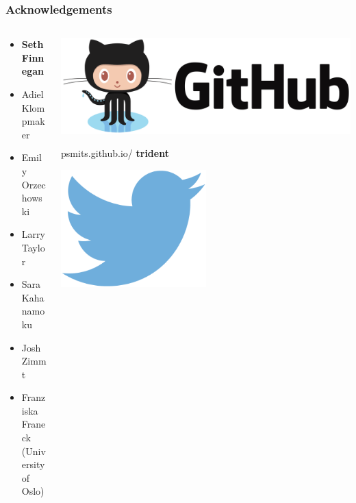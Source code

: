 \documentclass{beamer}
\begin{document}
\begin{frame}
  \frametitle{Acknowledgements}
  \begin{columns}
    \begin{column}{0.5\textwidth}
      \begin{itemize}
        \item \textbf{Seth Finnegan}
        \item Adiel Klompmaker 
        \item Emily Orzechowski
        \item Larry Taylor
        \item Sara Kahanamoku
        \item Josh Zimmt
        \item Franziska Franeck \\(University of Oslo)
      \end{itemize}
    \end{column}
    \begin{column}{0.5\textwidth}
      \begin{center}
        \includegraphics[height=0.15\textheight,width=\textwidth,keepaspectratio=true]{figure/github-logo}

        psmits.github.io/ \hspace*{0.05\textwidth} \textbf{trident}
      \end{center}
      \vspace*{0.02\textheight}
      \begin{center}
        \includegraphics[height=0.1\textheight,width=0.5\textwidth,keepaspectratio=true]{figure/twitter} 


\end{center}
\end{column}
\end{columns}
\end{frame}
\end{document}
